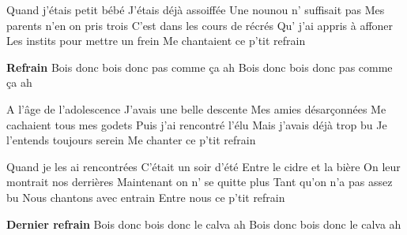 \footnotemark [
ititle={Bois donc},
tu={Ca fait pleurer le Bon Dieu (Julien Clerc)}]


\beginverse
Quand j'étais petit bébé
J'étais déjà assoiffée
Une nounou  n' suffisait pas
Mes parents n'en on pris trois
C'est dans les cours de récrés
Qu' j'ai appris à affoner
Les instits pour mettre un frein
Me chantaient ce p'tit refrain
\endverse

\beginchorus
\textbf{Refrain}
Bois donc bois donc pas comme ça ah
Bois donc bois donc pas comme ça ah
\endchorus

\beginverse
A l'âge de l'adolescence
J'avais une belle descente
Mes amies désarçonnées
Me cachaient tous mes godets
Puis j'ai rencontré l'élu
Mais j'avais déjà trop bu
Je l'entends toujours serein
Me chanter ce p'tit refrain
\endverse

\beginverse
Quand je les ai rencontrées
C'était un soir d'été
Entre le cidre et la bière
On leur montrait nos derrières
Maintenant on n' se quitte plus
Tant qu'on n'a pas assez bu
Nous chantons avec entrain
Entre nous ce p'tit refrain
\endverse

\beginchorus
\textbf{Dernier refrain}
Bois donc bois donc le calva ah
Bois donc bois donc le calva ah
\endchorus
\endsong